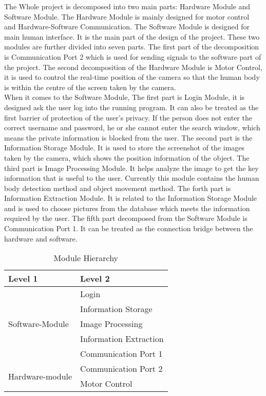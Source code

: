 \documentclass[12pt, titlepage]{article}
\begin{document}
The Whole project is decomposed into two main parts: Hardware Module and Software Module. The Hardware Module is mainly designed for motor control and Hardware-Software Communication. The Software Module is designed for main human interface. It is the main part of the design of the project. These two modules are further divided into seven parts. The first part of the decomposition is Communication Port 2 which is used for sending signals to the software part of the project. The second decomposition of the Hardware Module is Motor Control, it is used to control the real-time position of the camera so that the human body is within the centre of the screen taken by the camera.\\ 
When it comes to the Software Module, The first part is Login Module, it is designed ask the user log into the running program. It can also be treated as the first barrier of protection of the user's privacy. If the person does not enter the correct username and password, he or she cannot enter the search window, which means the private information is blocked from the user. The second part is the Information Storage Module. It is used to store the screenshot of the images taken by the camera, which shows the position information of the object. The third part is Image Processing Module. It helps analyze the image to get the key information that is useful to the user. Currently this module contains the human body detection method and object movement method. The forth part is  Information Extraction Module. It is related to the Information Storage Module and is used to choose pictures from the database which meets the information required by the user. The fifth part decomposed from the Software Module is Communication Port 1. It can be treated as the connection bridge between the hardware and software. 

\begin{table}[H]
\centering
\begin{tabular}{p{} p{}}
\toprule
\textbf{Level 1} & \textbf{Level 2}\\
\midrule

\multirow{5}{0.3\textwidth}{Software-Module} & 
Login  \\
& Information Storage \\
& Image Processing \\
& Information Extraction \\
& Communication Port 1 \\
\midrule

\multirow{2}{0.3\textwidth}{Hardware-module} & Communication Port 2\\
& Motor Control\\


\bottomrule

\end{tabular}
\caption{Module Hierarchy}
\label{TblMH}
\end{table}
\end{document}
